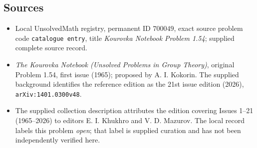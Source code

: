 \documentclass[11pt]{article}
\begin{document}
\subsection{Sources}
\begin{itemize}
\item Local UnsolvedMath registry, permanent ID \(700049\), exact source problem code \texttt{catalogue entry}, title \emph{Kourovka Notebook Problem 1.54}; supplied complete source record.
\item \emph{The Kourovka Notebook (Unsolved Problems in Group Theory)}, original Problem 1.54, first issue (1965); proposed by A. I. Kokorin. The supplied background identifies the reference edition as the 21st issue edition (2026), \texttt{arXiv:1401.0300v48}.
\item The supplied collection description attributes the edition covering Issues 1--21 (1965--2026) to editors E. I. Khukhro and V. D. Mazurov. The local record labels this problem \emph{open}; that label is supplied curation and has not been independently verified here.
\end{itemize}
\end{document}
